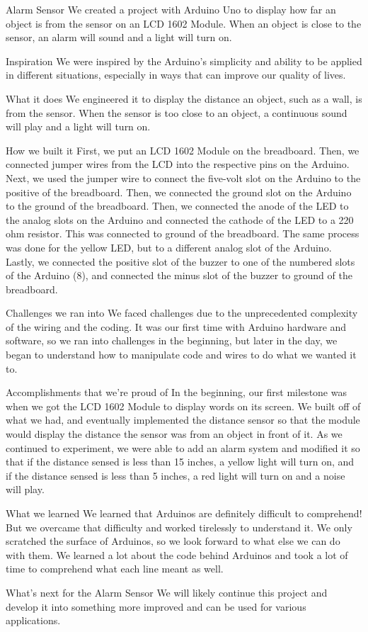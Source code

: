 Alarm Sensor
We created a project with Arduino Uno to display how far an object is from the sensor on an LCD 1602 Module. When an object is close to the sensor, an alarm will sound and a light will turn on.

Inspiration
We were inspired by the Arduino's simplicity and ability to be applied in different situations, especially in ways that can improve our quality of lives.

What it does
We engineered it to display the distance an object, such as a wall, is from the sensor. When the sensor is too close to an object, a continuous sound will play and a light will turn on.

How we built it
First, we put an LCD 1602 Module on the breadboard. Then, we connected jumper wires from the LCD into the respective pins on the Arduino. Next, we used the jumper wire to connect the five-volt slot on the Arduino to the positive of the breadboard. Then, we connected the ground slot on the Arduino to the ground of the breadboard. Then, we connected the anode of the LED to the analog slots on the Arduino and connected the cathode of the LED to a 220 ohm resistor. This was connected to ground of the breadboard. The same process was done for the yellow LED, but to a different analog slot of the Arduino. Lastly, we connected the positive slot of the buzzer to one of the numbered slots of the Arduino (8), and connected the minus slot of the buzzer to ground of the breadboard.

Challenges we ran into
We faced challenges due to the unprecedented complexity of the wiring and the coding. It was our first time with Arduino hardware and software, so we ran into challenges in the beginning, but later in the day, we began to understand how to manipulate code and wires to do what we wanted it to.

Accomplishments that we're proud of
In the beginning, our first milestone was when we got the LCD 1602 Module to display words on its screen. We built off of what we had, and eventually implemented the distance sensor so that the module would display the distance the sensor was from an object in front of it. As we continued to experiment, we were able to add an alarm system and modified it so that if the distance sensed is less than 15 inches, a yellow light will turn on, and if the distance sensed is less than 5 inches, a red light will turn on and a noise will play.

What we learned
We learned that Arduinos are definitely difficult to comprehend! But we overcame that difficulty and worked tirelessly to understand it. We only scratched the surface of Arduinos, so we look forward to what else we can do with them. We learned a lot about the code behind Arduinos and took a lot of time to comprehend what each line meant as well.

What's next for the Alarm Sensor
We will likely continue this project and develop it into something more improved and can be used for various applications.
